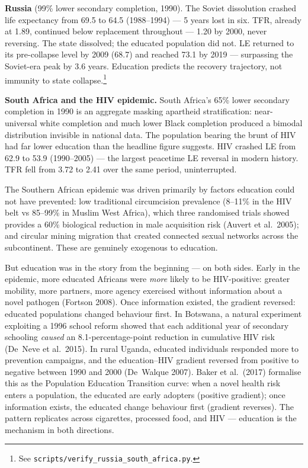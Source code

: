 \documentclass[12pt,letterpaper]{article}
\begin{document}
\textbf{Russia} (99\% lower secondary completion, 1990). The Soviet
dissolution crashed life expectancy from 69.5 to 64.5 (1988--1994) ---
5 years lost in six. TFR, already at 1.89, continued below replacement
throughout --- 1.20 by 2000, never reversing. The state dissolved; the
educated population did not. LE returned to its pre-collapse level by
2009 (68.7) and reached 73.1 by 2019 --- surpassing the Soviet-era peak
by 3.6 years. Education predicts the recovery trajectory, not immunity
to state collapse.\footnote{See
\texttt{scripts/verify\_russia\_south\_africa.py}.}

\textbf{South Africa and the HIV epidemic.} South Africa's 65\% lower
secondary completion in 1990 is an aggregate masking apartheid
stratification: near-universal white completion and much lower Black
completion produced a bimodal distribution invisible in national data.
The population bearing the brunt of HIV had far lower education than the
headline figure suggests. HIV crashed LE from 62.9 to 53.9
(1990--2005) --- the largest peacetime LE reversal in modern history.
TFR fell from 3.72 to 2.41 over the same period, uninterrupted.

The Southern African epidemic was driven primarily by factors education
could not have prevented: low traditional circumcision prevalence (8--11\%
in the HIV belt vs 85--99\% in Muslim West Africa), which three
randomised trials showed provides a 60\% biological reduction in male
acquisition risk (Auvert et al.~2005); and circular mining migration
that created connected sexual networks across the subcontinent. These
are genuinely exogenous to education.

But education was in the story from the beginning --- on both sides.
Early in the epidemic, more educated Africans were \emph{more} likely to
be HIV-positive: greater mobility, more partners, more agency exercised
without information about a novel pathogen (Fortson 2008). Once
information existed, the gradient reversed: educated populations changed
behaviour first. In Botswana, a natural experiment exploiting a 1996
school reform showed that each additional year of secondary schooling
\emph{caused} an 8.1-percentage-point reduction in cumulative HIV risk
(De~Neve et al.~2015). In rural Uganda, educated individuals responded
more to prevention campaigns, and the education--HIV gradient reversed
from positive to negative between 1990 and 2000 (De~Walque 2007). Baker
et al.\ (2017) formalise this as the Population Education Transition
curve: when a novel health risk enters a population, the educated are
early adopters (positive gradient); once information exists, the
educated change behaviour first (gradient reverses). The pattern
replicates across cigarettes, processed food, and HIV --- education is
the mechanism in both directions.
\end{document}
